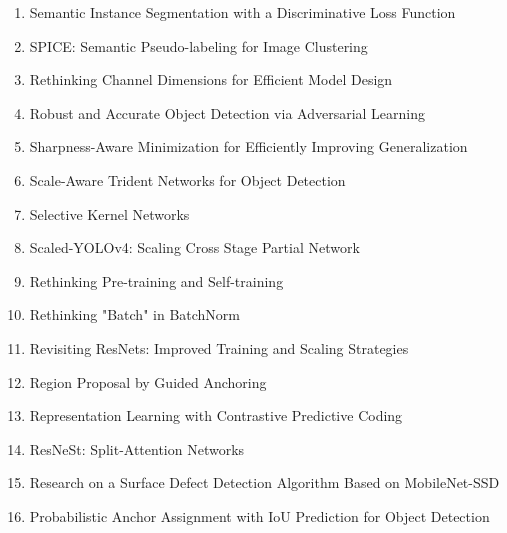 \documentclass[acmlarge]{acmart}
\begin{document}
\begin{enumerate}
	\item Semantic Instance Segmentation with a Discriminative Loss Function \cite{Brabandere2017SemanticIS} 

	\item SPICE: Semantic Pseudo-labeling for Image Clustering \cite{Niu2021SPICESP} 

	\item Rethinking Channel Dimensions for Efficient Model Design \cite{Han2021RethinkingCD} 

	\item Robust and Accurate Object Detection via Adversarial Learning \cite{Chen2021RobustAA} 

	\item Sharpness-Aware Minimization for Efficiently Improving Generalization \cite{Foret2021SharpnessAwareMF} 

	\item Scale-Aware Trident Networks for Object Detection \cite{Li2019ScaleAwareTN} 

	\item Selective Kernel Networks \cite{Li2019SelectiveKN} 

	\item Scaled-YOLOv4: Scaling Cross Stage Partial Network \cite{Wang2021ScaledYOLOv4SC} 

	\item Rethinking Pre-training and Self-training \cite{Zoph2020RethinkingPA} 

	\item Rethinking "Batch" in BatchNorm \cite{Wu2021RethinkingI} 

	\item Revisiting ResNets: Improved Training and Scaling Strategies \cite{Bello2021RevisitingRI} 

	\item Region Proposal by Guided Anchoring \cite{Wang2019RegionPB} 

	\item Representation Learning with Contrastive Predictive Coding \cite{Oord2018RepresentationLW} 

	\item ResNeSt: Split-Attention Networks \cite{Zhang2020ResNeStSN} 

	\item Research on a Surface Defect Detection Algorithm Based on MobileNet-SSD \cite{Li2018ResearchOA} 

	\item Probabilistic Anchor Assignment with IoU Prediction for Object Detection \cite{Kim2020ProbabilisticAA} 


\end{enumerate}
\end{document}
